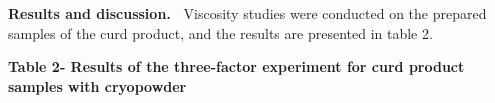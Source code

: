 {\bfseries Results and discussion.~} Viscosity studies were conducted on
the prepared samples of the curd product, and the results are presented
in table 2.

{\bfseries Table 2- Results of the three-factor experiment for curd product
samples with cryopowder}

